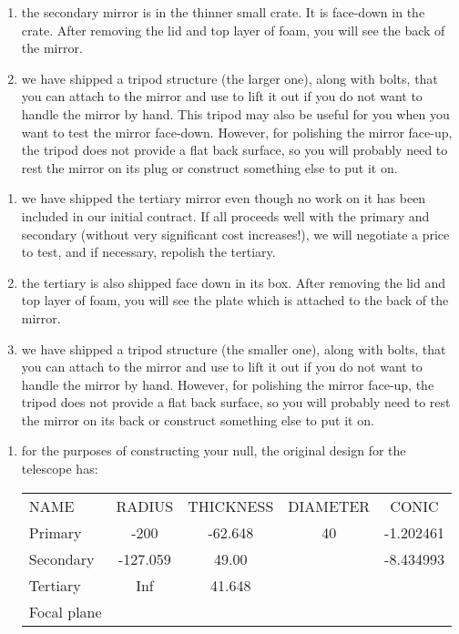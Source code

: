 \documentclass{letter}
\begin{document}
\begin{letter}
\begin{enumerate}
  \item the secondary mirror is in the thinner small crate. It is face-down in
    the crate. After removing the lid and top layer of foam, you will see
    the back of the mirror. 

  \item we have shipped a tripod structure (the larger one), along with bolts,
    that you can attach to the mirror and use to lift it out if you do
    not want to handle the mirror by hand. This tripod may also be useful
    for you when you want to test the mirror face-down. However, for
    polishing the mirror face-up, the tripod does not provide a flat back
    surface, so you will probably need to rest the mirror on its plug or
    construct something else to put it on.
\end{enumerate}

\begin{enumerate}

  \item we have shipped the tertiary mirror even though no work on it has been 
    included in our initial contract. If all proceeds well with the primary
    and secondary (without very significant cost increases!), we will 
    negotiate a price to test, and if necessary, repolish the tertiary.

  \item the tertiary is also shipped face down in its box. After removing the
    lid and top layer of foam, you will see the plate which is attached
    to the back of the mirror.

  \item we have shipped a tripod structure (the smaller one), along with bolts,
    that you can attach to the mirror and use to lift it out if you do
    not want to handle the mirror by hand. However, for
    polishing the mirror face-up, the tripod does not provide a flat back
    surface, so you will probably need to rest the mirror on its back or
    construct something else to put it on.

\end{enumerate}

\begin{enumerate}
  \item for the purposes of constructing your null, the original design for 
    the telescope has:

   \begin{center}
   \begin{tabular}{lcccc}
   NAME & RADIUS & THICKNESS & DIAMETER & CONIC \\
   Primary & -200 & -62.648 & 40 & -1.202461 \\
   Secondary & -127.059 & 49.00 & & -8.434993 \\
   Tertiary & Inf & 41.648 & & \\
   Focal plane & & &
   \end{tabular}
   \end{center}


\end{enumerate}
\end{letter}
\end{document}
